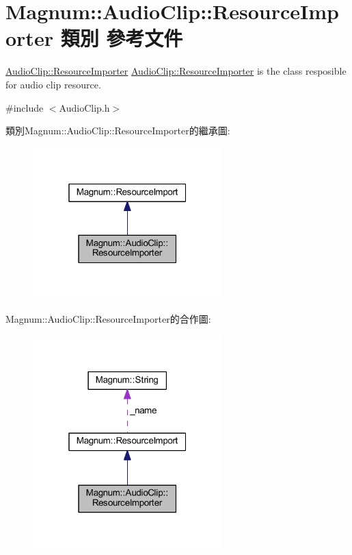 \hypertarget{class_magnum_1_1_audio_clip_1_1_resource_importer}{}\section{Magnum\+:\+:Audio\+Clip\+:\+:Resource\+Importer 類別 參考文件}
\label{class_magnum_1_1_audio_clip_1_1_resource_importer}


\hyperlink{class_magnum_1_1_audio_clip_1_1_resource_importer}{Audio\+Clip\+::\+Resource\+Importer} \hyperlink{class_magnum_1_1_audio_clip_1_1_resource_importer}{Audio\+Clip\+::\+Resource\+Importer} is the class resposible for audio clip resource.  




{\ttfamily \#include $<$Audio\+Clip.\+h$>$}



類別\+Magnum\+:\+:Audio\+Clip\+:\+:Resource\+Importer的繼承圖\+:\nopagebreak
\begin{figure}[H]
\begin{center}
\leavevmode
\includegraphics[width=208pt]{class_magnum_1_1_audio_clip_1_1_resource_importer__inherit__graph}
\end{center}
\end{figure}


Magnum\+:\+:Audio\+Clip\+:\+:Resource\+Importer的合作圖\+:\nopagebreak
\begin{figure}[H]
\begin{center}
\leavevmode
\includegraphics[width=208pt]{class_magnum_1_1_audio_clip_1_1_resource_importer__coll__graph}
\end{center}
\end{figure}
